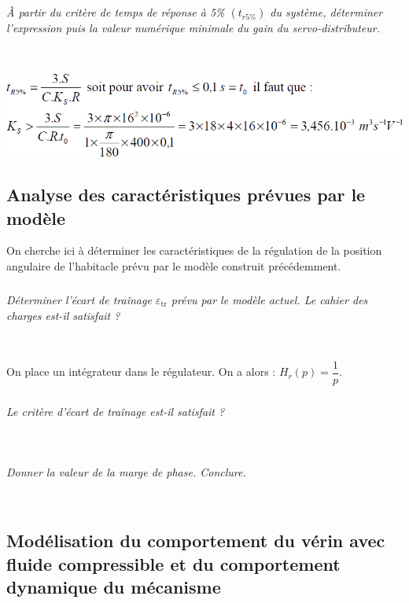 \begin{multicols}{2}
\begin{multicols}{2}
\subparagraph{}\textit{À partir du critère de temps de réponse à 5\% $(t_{r5\%})$ du système, déterminer l'expression puis la valeur numérique minimale du gain du servo-distributeur.} 

\ifprof
\begin{corrige}~\\
\begin{center}
\includegraphics[width=.95\linewidth]{images/cor_03}
\end{center}    
\end{corrige}
\else
\fi

\subsection*{Analyse des caractéristiques prévues par le modèle}


On cherche ici à déterminer les caractéristiques de la régulation de la position angulaire de l'habitacle prévu par le modèle construit précédemment.

\subparagraph{}\textit{Déterminer l'écart de traînage $\varepsilon_{\text{tr}}$ prévu par le modèle actuel. Le cahier des charges est-il satisfait ?} 
\ifprof
\begin{corrige}~\\
\end{corrige}
\else
\fi


On place un intégrateur dans le régulateur. On a alors : $H_r(p)=\dfrac{1}{p}$.
 

\subparagraph{}\textit{Le critère d'écart de traînage est-il satisfait ?} 
\ifprof
\begin{corrige}~\\
\end{corrige}
\else
\fi

\subparagraph{}\textit{Donner la valeur de la marge de phase. Conclure.} 
\ifprof
\begin{corrige}~\\
\end{corrige}
\else
\fi


\subsection*{Modélisation du comportement du vérin avec fluide compressible et du comportement dynamique du mécanisme}


\end{multicols}
\end{multicols}
